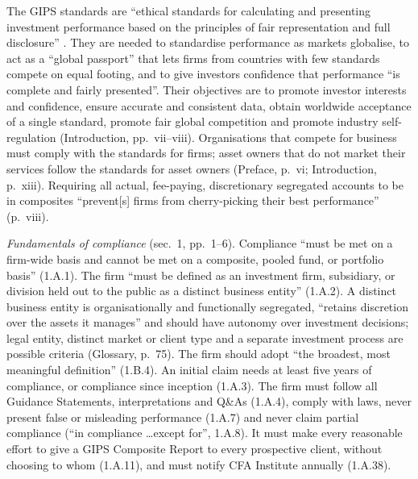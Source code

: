 \begin{qfdefinition}\label{def:gips-scope-verification}
 The GIPS standards are ``ethical standards for calculating and presenting investment performance based on the principles of fair representation and full disclosure'' \citep[Preface, p.~v]{wide-gips-2020}. They are needed to standardise performance as markets globalise, to act as a ``global passport'' that lets firms from countries with few standards compete on equal footing, and to give investors confidence that performance ``is complete and fairly presented''. Their objectives are to promote investor interests and confidence, ensure accurate and consistent data, obtain worldwide acceptance of a single standard, promote fair global competition and promote industry self-regulation (Introduction, pp.~vii--viii). Organisations that compete for business must comply with the standards for firms; asset owners that do not market their services follow the standards for asset owners (Preface, p.~vi; Introduction, p.~xiii). Requiring all actual, fee-paying, discretionary segregated accounts to be in composites ``prevent[s] firms from cherry-picking their best performance'' (p.~viii).

\emph{Fundamentals of compliance} (sec.~1, pp.~1--6). Compliance ``must be met on a firm-wide basis and cannot be met on a composite, pooled fund, or portfolio basis'' (1.A.1). The firm ``must be defined as an investment firm, subsidiary, or division held out to the public as a distinct business entity'' (1.A.2). A distinct business entity is organisationally and functionally segregated, ``retains discretion over the assets it manages'' and should have autonomy over investment decisions; legal entity, distinct market or client type and a separate investment process are possible criteria (Glossary, p.~75). The firm should adopt ``the broadest, most meaningful definition'' (1.B.4). An initial claim needs at least five years of compliance, or compliance since inception (1.A.3). The firm must follow all Guidance Statements, interpretations and Q\&As (1.A.4), comply with laws, never present false or misleading performance (1.A.7) and never claim partial compliance (``in compliance \ldots except for'', 1.A.8). It must make every reasonable effort to give a GIPS Composite Report to every prospective client, without choosing to whom (1.A.11), and must notify CFA Institute annually (1.A.38).


\end{qfdefinition}
